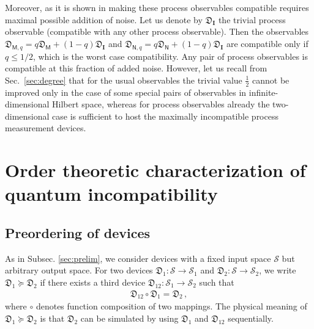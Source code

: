 \documentclass[12pt]{article}
\theoremstyle{definition}
\newcommand{\half}{\tfrac{1}{2}} %
\newcommand{\Mo}{\mathsf{M}}%
\newcommand{\No}{\mathsf{N}}%
\newcommand{\Dev}{\mathfrak{D}} %
\newcommand{\pgeq}{\succeq}
\begin{document}
{Moreover, as it is shown in \cite{SeReChZi15} making these process
observables compatible requires maximal possible addition of noise. 
Let us denote by $\Dev_\mathbf{I}$ the trivial process observable (compatible
with any other process observable). Then
the observables $\Dev_{\Mo,q}=q\Dev_\Mo+(1-q)\Dev_\mathbf{I}$
and $\Dev_{\No,q}=q\Dev_\No+(1-q)\Dev_\mathbf{I}$ are compatible only 
if $q\leq 1/2$, which is the worst case compatibility. Any pair of process
observables is compatible at this fraction of added noise. However, 
let us recall from Sec.~\ref{sec:degree} that for the usual observables the
trivial value $\half$ cannot be improved only in the case of some special pairs 
of observables in infinite-dimensional Hilbert space, 
whereas for process observables already the two-dimensional case is sufficient to host the maximally incompatible process measurement devices.

\section{Order theoretic characterization of quantum incompatibility}\label{sec:order}


\subsection{Preordering of devices}\label{sec:prelimorder}

As in Subsec. \ref{sec:prelim}, we consider devices with a fixed input space $\mathcal{S}$ but arbitrary output space. For two devices $\Dev_1: \mathcal{S} \to \mathcal{S}_1$ and $\Dev_2: \mathcal{S} \to \mathcal{S}_2$, 
we write $\Dev_1 \pgeq \Dev_2$ if there exists a third device $\Dev_{12}: \mathcal{S}_1 \to \mathcal{S}_2$ 
such that
\begin{align}
\Dev_{12} \circ \Dev_1 = \Dev_2 \, ,
\end{align}
where $\circ$ denotes function composition of two mappings.
The physical meaning of $\Dev_1 \pgeq \Dev_2$ is that $\Dev_2$ can be simulated by using $\Dev_1$ and $\Dev_{12}$ sequentially.

}
\end{document}
